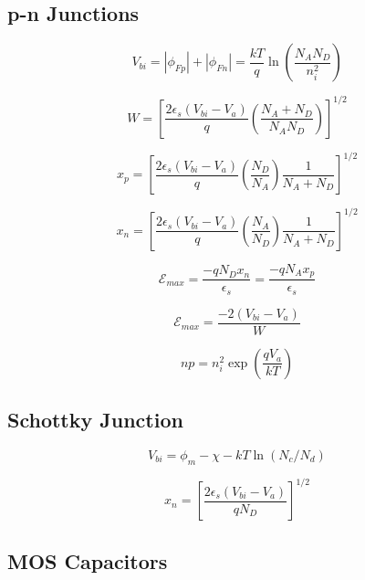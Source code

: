 \documentclass{infosheet}
\begin{document}
\subsection{p-n Junctions}

\begin{displaymath}
  V_{bi} = |\phi_{Fp}| + |\phi_{Fn}| = \frac{kT}{q}\ln\left(\frac{N_AN_D}{n_i^2}\right)
\end{displaymath}

\begin{displaymath}
  W = \left[\frac{2\epsilon_s(V_{bi}-V_a)}{q}\left(\frac{N_A + N_D}{N_AN_D}\right)\right]^{1/2}
\end{displaymath}

\begin{displaymath}
  x_p = \left[\frac{2\epsilon_s(V_{bi}-V_a)}{q}\left(\frac{N_D}{N_A}\right)\frac{1}{N_A+N_D}\right]^{1/2}
\end{displaymath}

\begin{displaymath}
  x_n = \left[\frac{2\epsilon_s(V_{bi}-V_a)}{q}\left(\frac{N_A}{N_D}\right)\frac{1}{N_A+N_D}\right]^{1/2}
\end{displaymath}

\begin{displaymath}
  \mathcal{E}_{max} = \frac{-qN_Dx_n}{\epsilon_s} = \frac{-qN_Ax_p}{\epsilon_s}
\end{displaymath}

\begin{displaymath}
  \mathcal{E}_{max} = \frac{-2(V_{bi} - V_a)}{W}
\end{displaymath}

\begin{displaymath}
  np=n_i^2\exp\left(\frac{qV_a}{kT}\right)
\end{displaymath}

\subsection{Schottky Junction}

\begin{displaymath}
  V_{bi} = \phi_m - \chi - kT\ln(N_c/N_d)
\end{displaymath}

\begin{displaymath}
  x_n = \left[\frac{2\epsilon_s(V_{bi} - V_a)}{qN_D}\right]^{1/2}
\end{displaymath}

\subsection{MOS Capacitors}

\lipsum[1-4]
\end{document}
